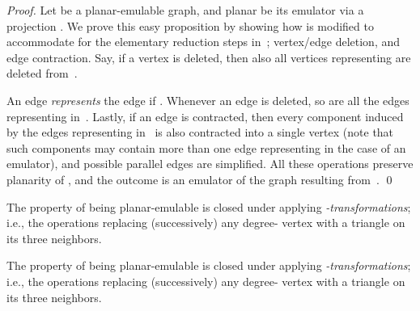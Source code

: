 \documentclass[envcountsect,envcountsame]{llncs}
\renewenvironment{accumulate}{}{}
\begin{document}
\begin{accumulate}
\begin{proof}
Let  be a planar-emulable graph, and planar  be its emulator via a
projection .
We prove this easy proposition by showing how  is modified to accommodate
for the elementary reduction steps in~;
vertex/edge deletion, and edge contraction.
Say, if a vertex  is deleted, then also all vertices
 representing  are deleted from~.

An edge  {\em represents} the edge  if
.
Whenever an edge  is deleted, so are all the edges 
representing  in~.
Lastly, if an edge  is contracted,
then every component induced by the edges representing  in~ is also
contracted into a single vertex
(note that such components may contain more than one edge representing 
in the case of an emulator), and possible parallel edges are simplified.
All these operations preserve planarity of ,
and the outcome is an emulator of the graph resulting from~.
\qed\end{proof}
\end{accumulate}


\begin{proposition}
\label{prop:clYDelta}
The property of being planar-emulable is closed under applying
\mbox{\em -transformations}; i.e., the operations replacing
(successively) any degree- vertex with a triangle on its three neighbors.
\end{proposition}
\begin{onlyaccum}
{\def\thetheorem{\ref{prop:clYDelta}}
\begin{proposition}
The property of being planar-emulable is closed under applying
\mbox{\em -transformations}; i.e., the operations replacing
(successively) any degree- vertex with a triangle on its three neighbors.
\end{proposition}}
\end{onlyaccum}
\end{document}
